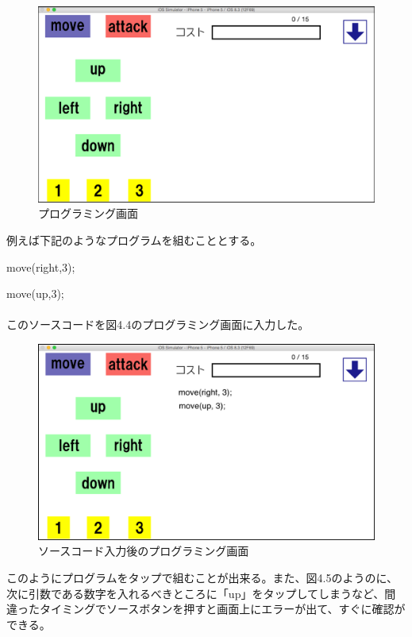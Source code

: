 \documentclass[openany,11pt,papersize]{jsbook}
\begin{document}
\begin{figure}[H]
\begin{center}
\includegraphics[width=12cm, bb=0 0 1136 662]{img/4thParagraph/Prog-ra_programming.png}
\end{center}
\caption{プログラミング画面}
\end{figure}

例えば下記のようなプログラムを組むこととする。
\par move(right,3);
\par move(up,3);
\\
\\
このソースコードを図4.4のプログラミング画面に入力した。

\begin{figure}[H]
\begin{center}
\includegraphics[width=12cm, bb=0 0 1136 662]{img/4thParagraph/Prog-ra_programming1.png}
\end{center}
\caption{ソースコード入力後のプログラミング画面}
\end{figure}

このようにプログラムをタップで組むことが出来る。また、図4.5のようのに、次に引数である数字を入れるべきところに「up」をタップしてしまうなど、間違ったタイミングでソースボタンを押すと画面上にエラーが出て、すぐに確認ができる。
\end{document}
